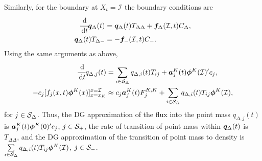 Similarly, for the boundary at \(X_t=\mathcal I\) the boundary conditions are 
\begin{align*}
\cfrac{\, \mathrm{d}}{\, \mathrm{d} t}\boldsymbol q_\Delta(t) &= \boldsymbol q_\Delta(t) T_{\Delta \Delta} + \boldsymbol f_\Delta(\mathcal I,t)C_\Delta,\\
\boldsymbol q_\Delta(t)T_{\Delta-}&=-\boldsymbol f_-(\mathcal I,t)C_-.
\end{align*}
Using the same arguments as above, 
\begin{align*}
\cfrac{\, \mathrm{d}}{\, \mathrm{d} t} q_{\Delta,j}(t) &= \sum_{i\in\mathcal{S}_\Delta}q_{\Delta,i}(t) T_{ij} + \boldsymbol a^K_j(t)\boldsymbol \phi^K(\mathcal I)'{}c_j,
\\-c_j[f_j(x,t)\boldsymbol\phi^K(x)]_{x=x_K}^{x=\mathcal I} & \approx c_j\boldsymbol a_j^{K}(t)F_j^{K,K}+\sum_{i\in\mathcal{S}_\Delta}q_{\Delta,i}(t)T_{ij}\boldsymbol\phi^K(\mathcal I),
\end{align*}
for \(j\in\mathcal{S}_\Delta\). 
Thus, the DG approximation of the flux into the point mass \(q_{\Delta,j}(t)\) is \(\boldsymbol a_j^K(t)\boldsymbol \phi^K(0)'{} c_j\), \(j\in\mathcal{S}_+\), the rate of transition of point mass within \(\boldsymbol q_{\Delta}(t)\) is \(T_{\Delta\Delta}\), and the DG approximation of the transition of point mass to density is \(\sum\limits_{i\in\mathcal{S}_\Delta}q_{\Delta,i}(t)T_{ij}\boldsymbol\phi^K(\mathcal I)\), \(j\in\mathcal{S}_-\). 

